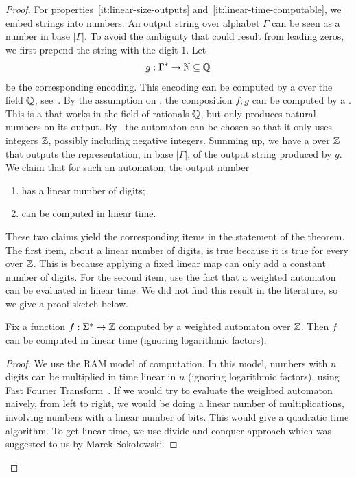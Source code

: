 \begin{proof}
    For properties~\ref{it:linear-size-outputs}
    and~\ref{it:linear-time-computable}, we embed strings into numbers. An
    output string over alphabet $\Gamma$ can be seen as a number in base
    $|\Gamma|$. To avoid the ambiguity that could result from leading zeros, we
    first prepend the string with the digit 1. Let 
    \begin{align*}
    g : \Gamma^* \to {\mathbb N} \subseteq {\mathbb Q}
    \end{align*} 
    be the corresponding encoding. This encoding can be computed by a  over the field ${\mathbb Q}$, see~\cite[Lemma 8.10]{bojanczyk_automata_2025}.
    By the assumption on , the
    composition $f;g$ can be computed by a . This is a
     that works in the field of rationals ${\mathbb Q}$, but  only
    produces natural numbers on its output. By~\cite[p.
    110]{BerstelReutenauer08} the automaton can be chosen so that it only uses
    integers ${\mathbb Z}$, possibly including negative integers. Summing up, we have
    a  over ${\mathbb Z}$ that outputs the representation, in base
    $|\Gamma|$, of the output string produced by $g$. We claim that for such an
    automaton, the output number
    \begin{enumerate}
        \item has a linear number of digits;
        \item can be computed in linear time.
    \end{enumerate}
    These two claims yield the corresponding items in the statement of the
    theorem. The first item, about a linear number of digits, is true because
    it is true for every  over ${\mathbb Z}$. This is because
    applying a fixed linear map can only add a constant number of digits. For the second item, use the fact that a weighted automaton can be evaluated in linear time. We did not find this result in the literature, so we give a proof sketch below.

    \begin{claim}
        Fix a function $f : \Sigma^* \to {\mathbb Z}$ computed by a weighted automaton over ${\mathbb Z}$. Then $f$ can be computed in linear time (ignoring logarithmic factors).
    \end{claim}
    \begin{proof}
        We use the RAM model of computation.  In this model, numbers with $n$ digits can be multiplied in time linear in $n$ (ignoring logarithmic factors), using Fast Fourier Transform~\cite[p.291]{schonhage1971schnelle}. If we would try to evaluate the weighted automaton naively, from left to right, we would be doing a linear number of multiplications, involving numbers with a linear number of bits. This would give a quadratic time algorithm. To get linear time, we use  divide and conquer approach which was suggested to us by Marek Soko{\l}owski.


\end{proof}
\end{proof}
